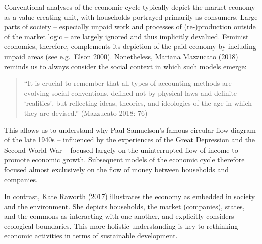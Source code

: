 \documentclass[
  a4paper,
  openany]{book}
\begin{document}
Conventional analyses of the economic cycle typically depict the market
economy as a value-creating unit, with households portrayed primarily as
consumers. Large parts of society -- especially unpaid work and
processes of (re-)production outside of the market logic -- are largely
ignored and thus implicitly devalued. Feminist economics, therefore,
complements its depiction of the paid economy by including unpaid areas
(see e.g.~Elson 2000). Nonetheless, Mariana Mazzucato (2018) reminds us
to always consider the social context in which such models emerge:

\begin{quote}
``It is crucial to remember that all types of accounting methods are
evolving social conventions, defined not by physical laws and definite
`realities', but reflecting ideas, theories, and ideologies of the age
in which they are devised.'' (Mazzucato 2018: 76)
\end{quote}

This allows us to understand why Paul Samuelson's famous circular flow
diagram of the late 1940s -- influenced by the experiences of the Great
Depression and the Second World War -- focused largely on the
uninterrupted flow of income to promote economic growth. Subsequent
models of the economic cycle therefore focused almost exclusively on the
flow of money between households and companies.

In contrast, Kate Raworth (2017) illustrates the economy as embedded in
society and the environment. She depicts households, the market
(companies), states, and the commons as interacting with one another,
and explicitly considers ecological boundaries. This more holistic
understanding is key to rethinking economic activities in terms of
sustainable development.
\end{document}
